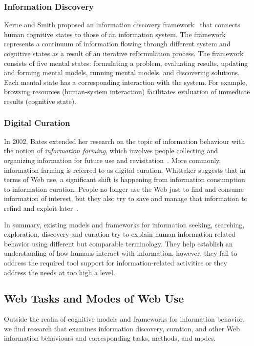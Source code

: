 \documentclass[review]{elsarticle}
\begin{document}
\subsubsection{Information Discovery}
Kerne and Smith proposed an information discovery framework~\cite{kerne2004information} that connects human cognitive states 
to those of an information system. The framework represents a continuum of information flowing through different system and cognitive states as a result of an iterative reformulation process. The framework consists of five mental states: formulating a problem, evaluating results, updating and forming mental models, running mental models, and discovering solutions. Each mental state has a corresponding interaction with the system. For example, browsing resources (human-system interaction) facilitates evaluation of immediate results (cognitive state). 
   
\subsubsection{Digital Curation}
In 2002, Bates extended her research on the topic of information behaviour with the notion of \textit{information farming}, which involves people collecting and organizing information for future use and revisitation~\cite{bates2002toward}. More commonly, information farming is referred to as digital curation. Whittaker suggests that in terms of Web use, a significant shift is happening from information consumption to information curation. People no longer use the Web just to find and consume information of interest, but they also try to save and manage that information to refind and exploit later~\cite{whittaker2011personal}. 

In summary, existing models and frameworks for information seeking, searching, exploration, discovery and curation try to explain human information-related behavior using different but comparable terminology. They help establish an understanding of how humans interact with information, however, they fail to address the required tool support for information-related activities or they address the needs at too high a level.  

\subsection{Web Tasks and Modes of Web Use}
Outside the realm of cognitive models and frameworks for information behavior, we find research that examines information discovery, curation, and other Web information behaviours and corresponding tasks, methods, and modes.
\end{document}
